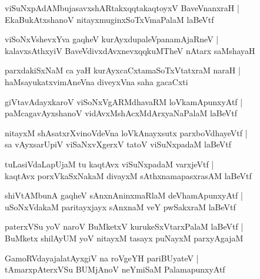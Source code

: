 \documentclass[twoside,12pt,openright]{book}
\newcounter{shloka}[chapter]
\begin{document}
\begin{shloka}%
viSuNxpAdAMbujasavxshARtakxqqtakaqtoyxV BaveVnanxraH |\\
EkaBukAtxshanoV nitayxmuginxSoTxVmaPalaM laBeVtf
\end{shloka}

\begin{shloka}%
viSoNxVshevxYva gaqheV kurAyxdupaleVpanamAjaRneV |\\
kalavxsAthxyiV BaveVdivxdAvxnevxqqkuMTheV nAtarx saMshayaH
\end{shloka}

\begin{shloka}%
parxdakiSxNaM ca yaH kurAyxcaCxtamaSoTxVtatxraM naraH |\\
haMsayukatxvimAneVna diveyxVna saha gacaCxti
\end{shloka}

\begin{shloka}%
giVtavAdayxkaroV viSoNxVgARMdhavaRM loVkamApunxyAtf |\\
paMcagavAyxshanoV vidAvxMshAcxMdArxyaNaPalaM laBeVtf
\end{shloka}

\begin{shloka}%
nitayxM shAsatxrXvinoVdeVna loVkAnayxsutx parxboVdhayeVtf |\\
sa vAyxsarUpiV viSaNxvXgerxV tatoV viSuNxpadaM laBeVtf 
\end{shloka}

\begin{shloka}%
tuLasiVdaLapUjaM tu kaqtAvx viSuNxpadaM varxjeVtf |\\
kaqtAvx porxVkaSxNakaM divayxM sAthxnamapasxrasAM laBeVtf 
\end{shloka}

\begin{shloka}%
shiVtAMbunA gaqheV sAnxnAninxmaRlaM deVhamApunxyAtf |\\
uSoNxVdakaM paritayxjayx sAnxnaM veY pwSakxraM laBeVtf
\end{shloka}

\begin{shloka}%
paterxVSu yoV naroV BuMketxV kurukeSxVtarxPalaM laBeVtf |\\
BuMketx shilAyUM yoV nitayxM tasayx puNayxM parxyAgajaM 
\end{shloka}

\begin{shloka}%
GamoRVdayajalatAyxgiV na roVgeYH pariBUyateV |\\
tAmarxpAterxVSu BUMjAnoV neYmiSaM PalamapunxyAtf 
\end{shloka}
\end{document}
